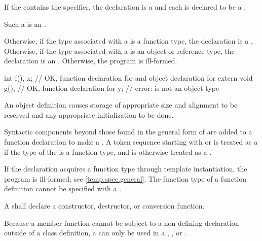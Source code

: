 \pnum
If the  contains the 
specifier, the declaration is a 
and each 
is declared to be a .
\begin{note}
Such a  is
an .
\end{note}
Otherwise, if the type associated with a 
is a function type,
the declaration is a .
Otherwise, if the type associated with a 
is an object or reference type, the declaration is
an .
Otherwise, the program is ill-formed.
\begin{example}
\begin{codeblock}
int f(), x;             // OK, function declaration for  and object declaration for 
extern void g(),        // OK, function declaration for 
  y;                    // error:  is not an object type
\end{codeblock}
\end{example}

\pnum
{}%
An object definition causes
storage of appropriate size and alignment to be reserved and
any appropriate initialization to be done.

\pnum
{}%
Syntactic components beyond those found in the general form of
 are added to a function declaration to make a
.
A token sequence starting with \tcode{\{} or \tcode{=}
is treated as a 
if the type of the 
is a function type, and
is otherwise
treated as a .
\begin{note}
If the declaration acquires a function type through template instantiation,
the program is ill-formed; see \ref{temp.spec.general}.
The function type of a function definition
cannot be specified with a .
\end{note}

\pnum
A  shall declare a
constructor, destructor, or conversion function.
\begin{note}
Because a member function cannot be subject to a non-defining declaration
outside of a class definition, a 
can only be used in a ,
, or
.
\end{note}

